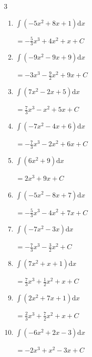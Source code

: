 \begin{multicols}{3}
\begin{enumerate}
        $\displaystyle =\frac{4}{3}x^{3}+4x^{2}+5x+ C$

  \item $\displaystyle \int \left( -5x^{2}+8x+1 \right) \mathrm{d}x$

        $\displaystyle =-\frac{5}{3}x^{3}+4x^{2}+x+ C$

  \item $\displaystyle \int \left( -9x^{2}-9x+9 \right) \mathrm{d}x$

        $\displaystyle =-3x^{3}-\frac{9}{2}x^{2}+9x+ C$

  \item $\displaystyle \int \left( 7x^{2}-2x+5 \right) \mathrm{d}x$

        $\displaystyle =\frac{7}{3}x^{3}-x^{2}+5x+ C$

  \item $\displaystyle \int \left( -7x^{2}-4x+6 \right) \mathrm{d}x$

        $\displaystyle =-\frac{7}{3}x^{3}-2x^{2}+6x+ C$

  \item $\displaystyle \int \left( 6x^{2}+9 \right) \mathrm{d}x$

        $\displaystyle =2x^{3}+9x+ C$

\columnbreak %

  \item $\displaystyle \int \left( -5x^{2}-8x+7 \right) \mathrm{d}x$

        $\displaystyle =-\frac{5}{3}x^{3}-4x^{2}+7x+ C$

  \item $\displaystyle \int \left( -7x^{2}-3x \right) \mathrm{d}x$

        $\displaystyle =-\frac{7}{3}x^{3}-\frac{3}{2}x^{2}+ C$

  \item $\displaystyle \int \left( 7x^{2}+x+1 \right) \mathrm{d}x$

        $\displaystyle =\frac{7}{3}x^{3}+\frac{1}{2}x^{2}+x+ C$

  \item $\displaystyle \int \left( 2x^{2}+7x+1 \right) \mathrm{d}x$

        $\displaystyle =\frac{2}{3}x^{3}+\frac{7}{2}x^{2}+x+ C$

  \item $\displaystyle \int \left( -6x^{2}+2x-3 \right) \mathrm{d}x$

        $\displaystyle =-2x^{3}+x^{2}-3x+ C$


\end{enumerate}
\end{multicols}
